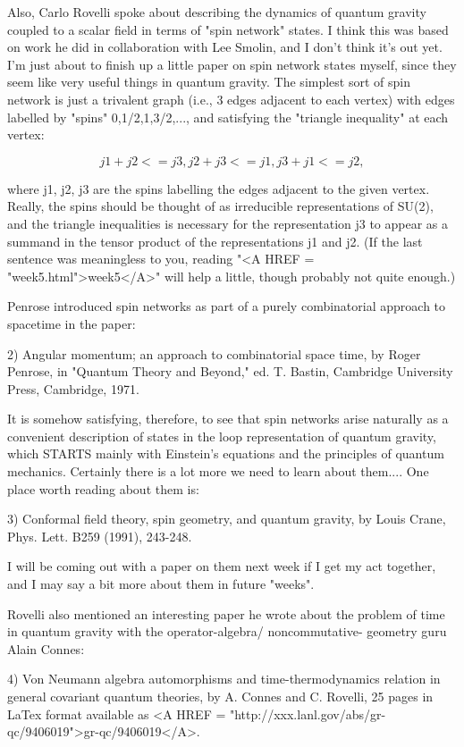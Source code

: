 Also, Carlo Rovelli spoke about describing the dynamics of quantum
gravity coupled to a scalar field in terms of "spin network" states.  I think
this was based on work he did in collaboration with Lee Smolin, and I
don't think it's out yet.  I'm just about to finish up a little paper on
spin network states myself, since they seem like very useful things in
quantum gravity.  The simplest sort of spin network is just a
trivalent graph (i.e., 3 edges adjacent to each vertex) with edges
labelled by "spins" 0,1/2,1,3/2,..., and satisfying the "triangle
inequality" at each vertex:


$$

         j1 + j2 <= j3,      j2 + j3 <= j1,      j3 + j1 <= j2,
$$
    

where j1, j2, j3 are the spins labelling the edges adjacent to the given
vertex.  Really, the spins should be thought of as irreducible
representations of SU(2), and the triangle inequalities is necessary
for the representation j3 to appear as a summand in the tensor
product of the representations j1 and j2.  (If the last sentence was
meaningless to you, reading "<A HREF = "week5.html">week5</A>" will help a little, though probably
not quite enough.)  

Penrose introduced spin networks as part of a purely combinatorial
approach to spacetime in the paper:

2) Angular momentum; an approach to combinatorial space
time, by Roger Penrose, in "Quantum Theory and Beyond," ed. T. Bastin,
Cambridge University Press, Cambridge, 1971.

It is somehow satisfying, therefore, to see that spin networks arise
naturally as a convenient description of states in the loop
representation of quantum gravity, which STARTS mainly with Einstein's
equations and the principles of quantum mechanics.  Certainly there is a
lot more we need to learn about them.... One place worth reading about
them is:

3) Conformal field theory, spin geometry, and quantum gravity, by Louis
Crane, Phys. Lett. B259 (1991), 243-248.

I will be coming out with a paper on them next week if I get my act
together, and I may say a bit more about them in future "weeks".  

Rovelli also mentioned an interesting paper he wrote about the problem of
time in quantum gravity with the operator-algebra/ noncommutative-
geometry guru Alain Connes:

4) Von Neumann algebra automorphisms and time-thermodynamics relation in
general covariant quantum theories, by A. Connes and C. Rovelli, 25
pages in LaTex format available as <A HREF = "http://xxx.lanl.gov/abs/gr-qc/9406019">gr-qc/9406019</A>.  

